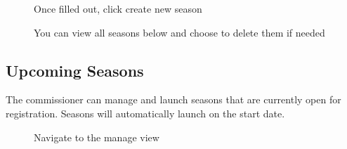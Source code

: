 \documentclass{article}
\begin{document}
\begin{figure}[H]
    \centering
    \caption{Once filled out, click create new season}
\end{figure}

\begin{figure}[H]
    \centering
    \caption{You can view all seasons below and choose to delete them if needed}
\end{figure}

\subsection{Upcoming Seasons}
The commissioner can manage and launch seasons that are currently open for registration. Seasons will automatically launch on the start date.

\begin{figure}[H]
    \centering
    \caption{Navigate to the manage view}
\end{figure}
\end{document}
